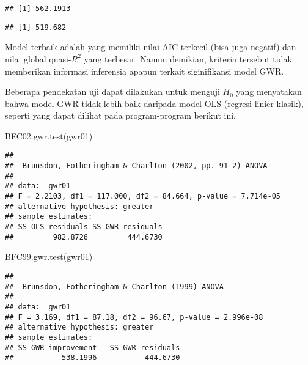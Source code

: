 \documentclass[
]{book}
\newenvironment{Shaded}{\begin{snugshade}}{\end{snugshade}}
\newcommand{\FunctionTok}[1]{\textcolor[rgb]{0.00,0.00,0.00}{#1}}
\newcommand{\NormalTok}[1]{#1}
\newcommand{\SpecialCharTok}[1]{\textcolor[rgb]{0.00,0.00,0.00}{#1}}
\begin{document}
\begin{verbatim}
## [1] 562.1913
\end{verbatim}

\begin{Shaded}
\end{Shaded}

\begin{verbatim}
## [1] 519.682
\end{verbatim}

Model terbaik adalah yang memiliki nilai AIC terkecil (bisa juga negatif) dan nilai global quasi-\(R^2\) yang terbesar. Namun demikian, kriteria tersebut tidak memberikan informasi inferensia apapun terkait siginifikansi model GWR.

Beberapa pendekatan uji dapat dilakukan untuk menguji \(H_0\) yang menyatakan bahwa model GWR tidak lebih baik daripada model OLS (regresi linier klasik), seperti yang dapat dilihat pada program-program berikut ini.

\begin{Shaded}
\begin{Highlighting}[]
\FunctionTok{BFC02.gwr.test}\NormalTok{(gwr01)}
\end{Highlighting}
\end{Shaded}

\begin{verbatim}
## 
##  Brunsdon, Fotheringham & Charlton (2002, pp. 91-2) ANOVA
## 
## data:  gwr01
## F = 2.2103, df1 = 117.000, df2 = 84.664, p-value = 7.714e-05
## alternative hypothesis: greater
## sample estimates:
## SS OLS residuals SS GWR residuals 
##         982.8726         444.6730
\end{verbatim}

\begin{Shaded}
\begin{Highlighting}[]
\FunctionTok{BFC99.gwr.test}\NormalTok{(gwr01)}
\end{Highlighting}
\end{Shaded}

\begin{verbatim}
## 
##  Brunsdon, Fotheringham & Charlton (1999) ANOVA
## 
## data:  gwr01
## F = 3.169, df1 = 87.18, df2 = 96.67, p-value = 2.996e-08
## alternative hypothesis: greater
## sample estimates:
## SS GWR improvement   SS GWR residuals 
##           538.1996           444.6730
\end{verbatim}
\end{document}
